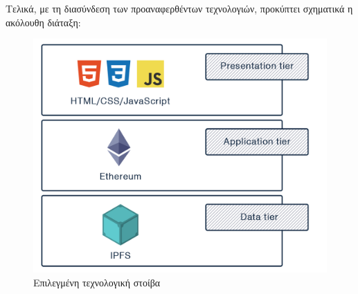 Τελικά, με τη διασύνδεση των προαναφερθέντων τεχνολογιών, προκύπτει σχηματικά η ακόλουθη διάταξη:

\begin{figure}[H]
    \centering
    \includegraphics[width=.55\textwidth]{assets/figures/chapter-3/3.2.technology.stack}
    \caption{Επιλεγμένη τεχνολογική στοίβα}
\end{figure}
